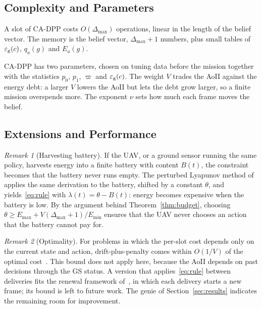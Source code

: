 \documentclass[journal]{IEEEtran}
\theoremstyle{remark}
\newtheorem{remark}{Remark}
\newcommand{\ee}{\varepsilon}
\begin{document}
\subsection{Complexity and Parameters}
A slot of CA-DPP costs $O(\Delta_{\max})$ operations, linear in the length of the belief vector. The memory is the belief vector, $\Delta_{\max}+1$ numbers, plus small tables of $\ee_{\rm g}(c)$, $q_a(g)$ and $E_a(g)$.

CA-DPP has two parameters, chosen on tuning data before the mission together with the statistics $p_0$, $p_1$, $\varpi$ and $\ee_{\rm g}(c)$. The weight $V$ trades the AoII against the energy debt: a larger $V$ lowers the AoII but lets the debt grow larger, so a finite mission overspends more. The exponent $\nu$ sets how much each frame moves the belief.

\subsection{Extensions and Performance}
\begin{remark}[Harvesting battery]\label{rem:harvest}
If the UAV, or a ground sensor running the same policy, harvests energy into a finite battery with content $B(t)$, the constraint becomes that the battery never runs empty. The perturbed Lyapunov method of~\cite{huang2013eh} applies the same derivation to the battery, shifted by a constant $\theta$, and yields~\eqref{eq:rule} with $\lambda(t)=\theta-B(t)$: energy becomes expensive when the battery is low. By the argument behind Theorem~\ref{thm:budget}, choosing $\theta\ge E_{\max}+V(\Delta_{\max}+1)/E_{\min}$ ensures that the UAV never chooses an action that the battery cannot pay for.
\end{remark}

\begin{remark}[Optimality]\label{rem:opt}
For problems in which the per-slot cost depends only on the current state and action, drift-plus-penalty comes within $O(1/V)$ of the optimal cost~\cite{neely2010book}. This bound does not apply here, because the AoII depends on past decisions through the GS status. A version that applies~\eqref{eq:rule} between deliveries fits the renewal framework of~\cite{neely2013renewal}, in which each delivery starts a new frame; its bound is left to future work. The genie of Section~\ref{sec:results} indicates the remaining room for improvement.
\end{remark}
\end{document}

